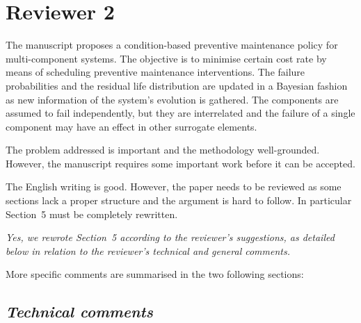 \documentclass[authoryear]{elsarticle}
\begin{document}
\section*{Reviewer 2}

The manuscript proposes a condition-based preventive maintenance policy for multi-component systems. The objective is to minimise certain cost rate by means of scheduling preventive maintenance interventions. The failure probabilities and the residual life distribution are updated in a Bayesian fashion as new information of the system’s evolution is gathered. The components are assumed to fail independently, but they are interrelated and the failure of a single component may have an effect in other surrogate elements.

The problem addressed is important and the methodology well-grounded. However, the manuscript requires some important work before it can be accepted.

The English writing is good. However, the paper needs to be reviewed as some sections lack a proper structure and the argument is hard to follow. In particular Section~5 must be completely rewritten.

\smallskip

\emph{Yes, we rewrote Section~5 according to the reviewer's suggestions,
as detailed below in relation to the reviewer's technical and general comments.}

\smallskip

More specific comments are summarised in the two following sections:

\subsection*{\emph{Technical comments}}
\end{document}
